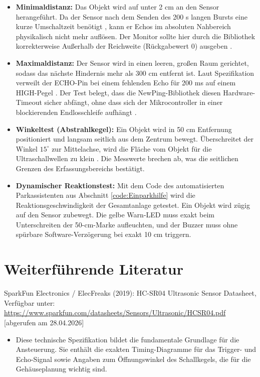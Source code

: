 \begin{itemize}
	\item \textbf{Minimaldistanz:} Das Objekt wird auf unter 2 cm an den Sensor herangeführt. Da der Sensor nach dem Senden des 200 \textmu s langen Bursts eine kurze Umschaltzeit benötigt \cite{KT:2012}, kann er Echos im absoluten Nahbereich physikalisch nicht mehr auflösen. Der Monitor sollte hier durch die Bibliothek korrekterweise Au\ss erhalb der Reichweite (Rückgabewert 0) ausgeben \cite{Eckel:2023}.
	
	\item \textbf{Maximaldistanz:} Der Sensor wird in einen leeren, gro\ss en Raum gerichtet, sodass das nächste Hindernis mehr als 300 cm entfernt ist. Laut Spezifikation verweilt der ECHO-Pin bei einem fehlenden Echo für 200 ms auf einem HIGH-Pegel \cite{KT:2012}. Der Test belegt, dass die NewPing-Bibliothek diesen Hardware-Timeout sicher abfängt, ohne dass sich der Mikrocontroller in einer blockierenden Endlosschleife aufhängt \cite{Eckel:2023}.
	
	\item \textbf{Winkeltest (Abstrahlkegel):} Ein Objekt wird in 50 cm Entfernung positioniert und langsam seitlich aus dem Zentrum bewegt. Überschreitet der Winkel $15^\circ$ zur Mittelachse, wird die Fläche vom Objekt für die Ultraschallwellen zu klein \cite{KT:2012}. Die Messwerte brechen ab, was die seitlichen Grenzen des Erfassungsbereichs bestätigt.
	
	\item \textbf{Dynamischer Reaktionstest:} Mit dem Code des automatisierten Parkassistenten aus Abschnitt \ref{code:Einparkhilfe} wird die Reaktionsgeschwindigkeit der Gesamtanlage getestet. Ein Objekt wird zügig auf den Sensor zubewegt. Die gelbe Warn-LED muss exakt beim Unterschreiten der 50-cm-Marke aufleuchten, und der Buzzer muss ohne spürbare Software-Verzögerung bei exakt 10 cm triggern.
\end{itemize}

\section{Weiterführende Literatur}

SparkFun Electronics / ElecFreaks (2019): HC-SR04 Ultrasonic Sensor Datasheet, Verfügbar unter: \url{https://www.sparkfun.com/datasheets/Sensors/Ultrasonic/HCSR04.pdf} [abgerufen am 28.04.2026]

\begin{itemize}
	\item Diese technische Spezifikation bildet die fundamentale Grundlage für die Ansteuerung. Sie enthält die exakten Timing-Diagramme für das Trigger- und Echo-Signal sowie Angaben zum Öffnungswinkel des Schallkegels, die für die Gehäuseplanung wichtig sind.
\end{itemize}

